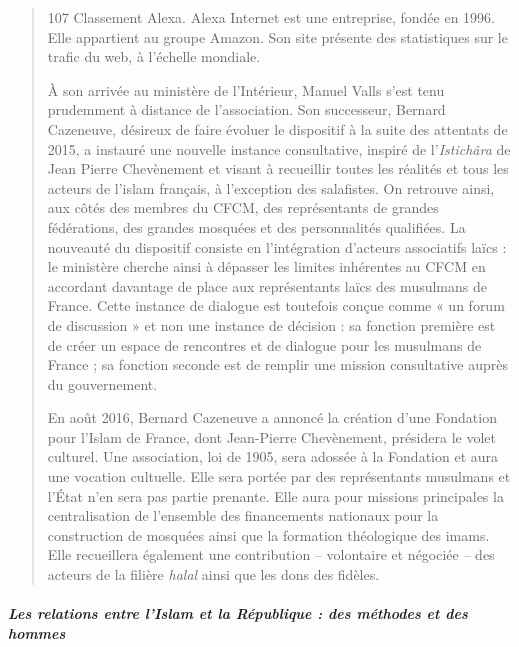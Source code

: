 \begin{quote}
107 Classement Alexa. Alexa Internet est une entreprise, fondée en 1996.
Elle appartient au groupe Amazon. Son site présente des statistiques sur
le trafic du web, à l'échelle mondiale.



À son arrivée au ministère de l'Intérieur, Manuel Valls s'est tenu
prudemment à distance de l'association. Son successeur, Bernard
Cazeneuve, désireux de faire évoluer le dispositif à la suite des
attentats de 2015, a instauré une nouvelle instance consultative,
inspiré de l'\emph{Istichâra} de Jean Pierre Chevènement et visant à
recueillir toutes les réalités et tous les acteurs de l'islam français,
à l'exception des salafistes. On retrouve ainsi, aux côtés des membres
du CFCM, des représentants de grandes fédérations, des grandes mosquées
et des personnalités qualifiées. La nouveauté du dispositif consiste en
l'intégration d'acteurs associatifs laïcs : le ministère cherche ainsi à
dépasser les limites inhérentes au CFCM en accordant davantage de place
aux représentants laïcs des musulmans de France. Cette instance de
dialogue est toutefois conçue comme « un forum de discussion » et non
une instance de décision : sa fonction première est de créer un espace
de rencontres et de dialogue pour les musulmans de France ; sa fonction
seconde est de remplir une mission consultative auprès du gouvernement.

En août 2016, Bernard Cazeneuve a annoncé la création d'une Fondation
pour l'Islam de France, dont Jean-Pierre Chevènement, présidera le volet
culturel. Une association, loi de 1905, sera adossée à la Fondation et
aura une vocation cultuelle. Elle sera portée par des représentants
musulmans et l'État n'en sera pas partie prenante. Elle aura pour
missions principales la centralisation de l'ensemble des financements
nationaux pour la construction de mosquées ainsi que la formation
théologique des imams. Elle recueillera également une contribution --
volontaire et négociée -- des acteurs de la filière \emph{halal} ainsi
que les dons des fidèles.
\end{quote}

\hypertarget{les-relations-entre-lislam-et-la-ruxe9publique-des-muxe9thodes-et-des-hommes}{%
\subparagraph{Les relations entre l'Islam et la République : des
méthodes et des
hommes}\label{les-relations-entre-lislam-et-la-ruxe9publique-des-muxe9thodes-et-des-hommes}}

